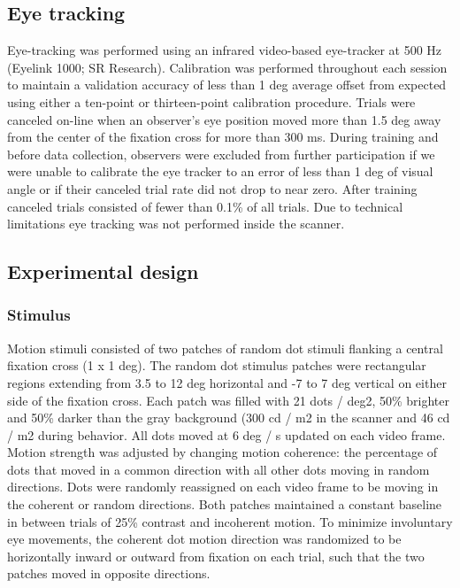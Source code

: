 \documentclass{report}
\begin{document}
\subsection{Eye tracking}

Eye-tracking was performed using an infrared video-based eye-tracker at 500 Hz (Eyelink 1000; SR Research). Calibration was performed throughout each session to maintain a validation accuracy of less than 1 deg average offset from expected using either a ten-point or thirteen-point calibration procedure. Trials were canceled on-line when an observer’s eye position moved more than 1.5 deg away from the center of the fixation cross for more than 300 ms. During training and before data collection, observers were excluded from further participation if we were unable to calibrate the eye tracker to an error of less than 1 deg of visual angle or if their canceled trial rate did not drop to near zero. After training canceled trials consisted of fewer than 0.1\% of all trials. Due to technical limitations eye tracking was not performed inside the scanner. 

\subsection{Experimental design}

\subsubsection{Stimulus}

Motion stimuli consisted of two patches of random dot stimuli flanking a central fixation cross (1 x 1 deg). The random dot stimulus patches were rectangular regions extending from 3.5 to 12 deg horizontal and -7 to 7 deg vertical on either side of the fixation cross. Each patch was filled with 21 dots / deg2, 50\% brighter and 50\% darker than the gray background (300 cd / m2 in the scanner and 46 cd / m2 during behavior. All dots moved at 6 deg / s updated on each video frame. Motion strength was adjusted by changing motion coherence: the percentage of dots that moved in a common direction with all other dots moving in random directions. Dots were randomly reassigned on each video frame to be moving in the coherent or random directions. Both patches maintained a constant baseline in between trials of 25\% contrast and incoherent motion. To minimize involuntary eye movements, the coherent dot motion direction was randomized to be horizontally inward or outward from fixation on each trial, such that the two patches moved in opposite directions. 
\end{document}
